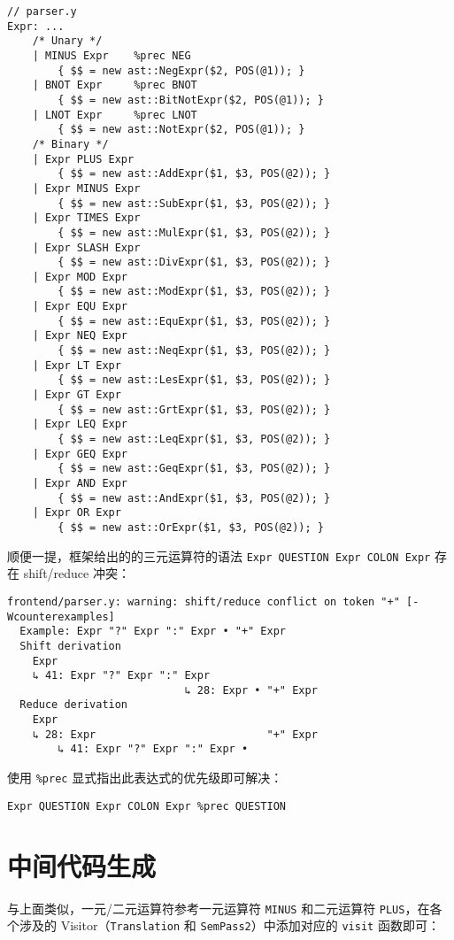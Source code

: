 \documentclass[a4paper]{article}
\begin{document}
\begin{lstlisting}
// parser.y
Expr: ...
    /* Unary */
    | MINUS Expr    %prec NEG
        { $$ = new ast::NegExpr($2, POS(@1)); }
    | BNOT Expr     %prec BNOT
        { $$ = new ast::BitNotExpr($2, POS(@1)); }
    | LNOT Expr     %prec LNOT
        { $$ = new ast::NotExpr($2, POS(@1)); }
    /* Binary */
    | Expr PLUS Expr
        { $$ = new ast::AddExpr($1, $3, POS(@2)); }
    | Expr MINUS Expr
        { $$ = new ast::SubExpr($1, $3, POS(@2)); }
    | Expr TIMES Expr
        { $$ = new ast::MulExpr($1, $3, POS(@2)); }
    | Expr SLASH Expr
        { $$ = new ast::DivExpr($1, $3, POS(@2)); }
    | Expr MOD Expr
        { $$ = new ast::ModExpr($1, $3, POS(@2)); }
    | Expr EQU Expr
        { $$ = new ast::EquExpr($1, $3, POS(@2)); }
    | Expr NEQ Expr
        { $$ = new ast::NeqExpr($1, $3, POS(@2)); }
    | Expr LT Expr
        { $$ = new ast::LesExpr($1, $3, POS(@2)); }
    | Expr GT Expr
        { $$ = new ast::GrtExpr($1, $3, POS(@2)); }
    | Expr LEQ Expr
        { $$ = new ast::LeqExpr($1, $3, POS(@2)); }
    | Expr GEQ Expr
        { $$ = new ast::GeqExpr($1, $3, POS(@2)); }
    | Expr AND Expr
        { $$ = new ast::AndExpr($1, $3, POS(@2)); }
    | Expr OR Expr
        { $$ = new ast::OrExpr($1, $3, POS(@2)); }
\end{lstlisting}

顺便一提，框架给出的的三元运算符的语法 \texttt{Expr QUESTION Expr COLON Expr} 存在 shift/reduce 冲突：

\begin{lstlisting}
frontend/parser.y: warning: shift/reduce conflict on token "+" [-Wcounterexamples]
  Example: Expr "?" Expr ":" Expr • "+" Expr
  Shift derivation
    Expr
    ↳ 41: Expr "?" Expr ":" Expr
                            ↳ 28: Expr • "+" Expr
  Reduce derivation
    Expr
    ↳ 28: Expr                           "+" Expr
        ↳ 41: Expr "?" Expr ":" Expr •
\end{lstlisting}

使用 \texttt{\%prec} 显式指出此表达式的优先级即可解决：

\begin{lstlisting}
Expr QUESTION Expr COLON Expr %prec QUESTION
\end{lstlisting}

\section{中间代码生成}

与上面类似，一元/二元运算符参考一元运算符 \texttt{MINUS} 和二元运算符 \texttt{PLUS}，在各个涉及的 Visitor（\texttt{Translation} 和 \texttt{SemPass2}）中添加对应的 \texttt{visit} 函数即可：
\end{document}
